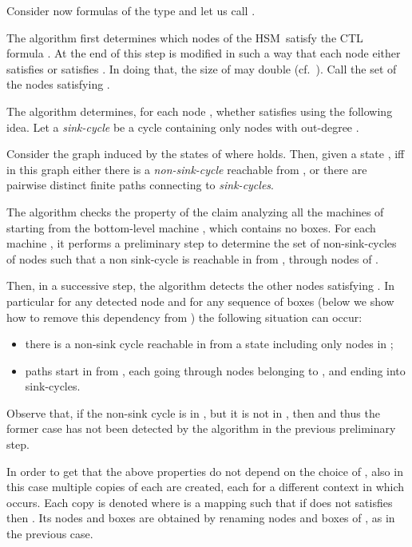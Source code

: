 \documentclass[letterpaper,twocolumn,10pt]{article}
\def    \ctl        {\mbox{\textsc{CTL }\xspace}}
\newcommand{\HSM}{HSM}
\begin{document}
Consider  now formulas of the type  and let us call .

The algorithm  first determines which nodes of the \HSM\  satisfy the \ctl
formula .  At the end of this step
  is modified in such a way that  each node  either  satisfies  or
satisfies . In doing that, the size of  may double (cf.~\cite{AY01}).
Call  the set of the nodes satisfying .

The algorithm determines, for  each node , whether  satisfies 
using the following idea. Let a {\em sink-cycle} be a cycle
containing only nodes with out-degree .

Consider
 the graph induced by the states of  where   holds.
Then, given a state ,    iff in this graph
either there is a \emph{non-sink-cycle} reachable from , or
there are  pairwise distinct finite paths connecting  to
\emph{sink-cycles}.

The algorithm  checks the property of the claim analyzing all the machines  of 
starting from the bottom-level machine , which  contains no boxes.
For each machine , it performs a preliminary step to determine
the set of non-sink-cycles  of nodes  such that   a non sink-cycle
is reachable in  from  , through nodes of .


Then, in a successive  step, the algorithm detects the other nodes satisfying  .
In particular for any detected node  and
for any sequence  of boxes (below we show how to remove this dependency from )
the following situation can occur:
 \begin{itemize}
 \item
there is a non-sink cycle reachable in  from a state  including only nodes in ;
\item
  paths start in 
from  ,  each going through nodes belonging to  , and ending into sink-cycles.
\end{itemize}

Observe that, if the  non-sink cycle is in   , but it is not  in , then
  and thus
 the former case has not been detected by the algorithm in the previous preliminary step.

In order to  get that the above properties do not depend on the choice of
, also in  this case multiple copies of each  are created, each for a different
context in which  occurs.
Each copy is denoted  where  
is a mapping such that if  does not satisfies  then .
Its nodes and boxes are obtained by renaming  nodes and boxes of
, as in the previous case.
\end{document}
